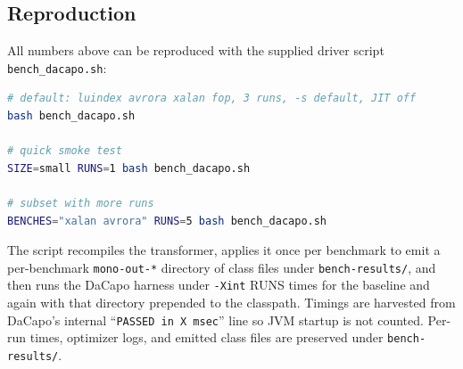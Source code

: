 \documentclass[11pt,a4paper]{article}
\begin{document}
\subsection{Reproduction}

All numbers above can be reproduced with the supplied driver script
\texttt{bench\_dacapo.sh}:

\begin{lstlisting}[language=bash]
# default: luindex avrora xalan fop, 3 runs, -s default, JIT off
bash bench_dacapo.sh

# quick smoke test
SIZE=small RUNS=1 bash bench_dacapo.sh

# subset with more runs
BENCHES="xalan avrora" RUNS=5 bash bench_dacapo.sh
\end{lstlisting}

The script recompiles the transformer, applies it once per benchmark
to emit a per-benchmark \texttt{mono-out-*} directory of class files
under \texttt{bench-results/}, and then runs the DaCapo harness under
\texttt{-Xint} RUNS times for the baseline and again with that
directory prepended to the classpath. Timings are harvested from
DaCapo's internal ``\texttt{PASSED in X msec}'' line so JVM startup is
not counted. Per-run times, optimizer logs, and emitted class files
are preserved under \texttt{bench-results/}.
\end{document}
